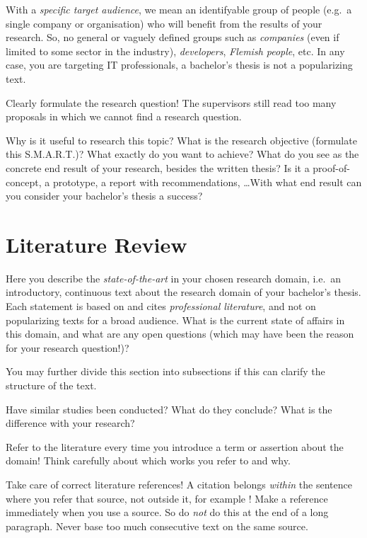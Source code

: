\documentclass[english]{hogent-article}
\begin{document}
With a \emph{specific target audience}, we mean an identifyable group of people (e.g.\ a single company or organisation) who will benefit from the results of your research. So, no general or vaguely defined groups such as \emph{companies} (even if limited to some sector in the industry), \emph{developers}, \emph{Flemish people}, etc. In any case, you are targeting IT professionals, a bachelor's thesis is not a popularizing text.

Clearly formulate the research question! The supervisors still read too many proposals in which we cannot find a research question.

Why is it useful to research this topic? What is the research objective (formulate this S.M.A.R.T.)? What exactly do you want to achieve? What do you see as the concrete end result of your research, besides the written thesis? Is it a proof-of-concept, a prototype, a report with recommendations, \ldots With what end result can you consider your bachelor's thesis a success?

\section{Literature Review}%
\label{sec:literature review}


Here you describe the \emph{state-of-the-art} in your chosen research domain, i.e.\ an introductory, continuous text about the research domain of your bachelor's thesis. Each statement is based on and cites \emph{professional literature}, and not on popularizing texts for a broad audience. What is the current state of affairs in this domain, and what are any open questions (which may have been the reason for your research question!)?

You may further divide this section into subsections if this can clarify the structure of the text.

Have similar studies been conducted? What do they conclude? What is the difference with your research?

Refer to the literature every time you introduce a term or assertion about the domain! Think carefully about which works you refer to and why.

Take care of correct literature references! A citation belongs \emph{within} the sentence where you refer that source, not outside it, for example \autocite{Hykes2013}! Make a reference immediately when you use a source. So do \emph{not} do this at the end of a long paragraph. Never base too much consecutive text on the same source.
\end{document}
